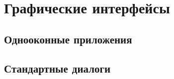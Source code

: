 \section{Графические интерфейсы}

\subsection{Однооконные приложения}

\subsection{Стандартные диалоги}
